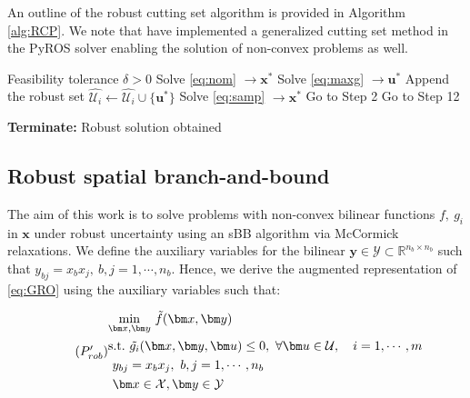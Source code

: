 \documentclass[sn-mathphys-num]{sn-jnl}
\begin{document}
An outline of the robust cutting set algorithm is provided in Algorithm \ref{alg:RCP}. We note that \citet{Isenberg2021} have implemented a generalized cutting set method in the PyROS solver enabling the solution of non-convex problems as well.

\begin{algorithm}
\caption{Robust Cutting Set Algorithm}
\label{alg:RCP}
\begin{algorithmic}[1] %
\Require Feasibility tolerance $\delta>0$
    \State Solve \eqref{eq:nom} $\rightarrow \bm x^*$
    \State Solve \eqref{eq:maxg} $\rightarrow \bm u^*$ 
        \State Append the robust set $\hat{\mathcal{U}_i}\leftarrow \hat{\mathcal{U}_i} \cup \{\bm u^*\}$
\EndIf
\EndFor
{}
            \State Solve \eqref{eq:samp} $\rightarrow \bm x^*$
            \State Go to Step 2
    \Else
        \State Go to Step 12
    \EndIf

    \State \textbf{Terminate:} Robust solution obtained
\end{algorithmic}
\end{algorithm}

\subsection{Robust spatial branch-and-bound}
The aim of this work is to solve problems with non-convex bilinear functions $f,~g_i$ in $\bm x$ under robust uncertainty using an sBB algorithm via McCormick relaxations. We define the auxiliary variables for the bilinear $\bm y\in \mathcal{Y}\subset \mathbb{R}^{n_b\times n_b}$ such that $y_{bj}=x_bx_j, ~ b,j=1,\cdots, n_b$. Hence, we derive the augmented representation of \eqref{eq:GRO} using the auxiliary variables such that:

\begin{equation}\tag{$P'_{rob}$}\label{eq:auxGRO}
\begin{aligned}
&\underset{\bm x, \bm y}{\min}~\tilde{f}(\bm x, \bm y)\\
&\text{s.t.}~ \tilde{g_i}(\bm x,\bm y,\bm u)\leq 0,~\forall \bm u \in \mathcal{U},\quad i=1,\cdots,m\\
&\ y_{bj}=x_bx_j, ~b,j=1,\cdots,n_b\\
&\ \bm x \in \mathcal{X}, \bm y \in \mathcal{Y}
\end{aligned}
\end{equation}
\end{document}
